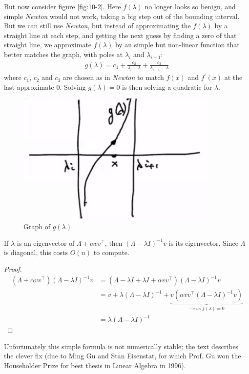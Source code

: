 \documentclass[11pt]{article}
\numberwithin{equation}{section}
\begin{document}
But now consider figure \ref{fig:10-2}. Here $f(\lambda)$ no longer looks so benign, and simple \textit{Newton} would not work,
taking a big step out of the bounding interval. But we can still use \textit{Newton}, but instead of approximating the $f(\lambda)$ by a straight line at each step,
and getting the next guess by finding a zero of that straight line, we approximate $f(\lambda)$ by an simple but non-linear function that better matches the graph, 
with poles at $\lambda_i$ and $\lambda_{i+1}$:
\begin{align*}
    g(\lambda)=c_{1}+ \frac{c_{2}}{\lambda_{i}-\lambda} + \frac{c_{3}}{\lambda_{i+1}-\lambda}
\end{align*}
where $c_1$, $c_2$ and $c_3$ are chosen as in \textit{Newton} to match $f(x)$ and $f^\prime (x)$ at the last approximate 0. 
Solving $g(\lambda)=0$ is then solving a quadratic for $\lambda$.

\begin{figure}[h]
    \centering
    \includegraphics[width = 10cm]{images/lec10-3.png}
    \caption{Graph of $g(\lambda)$}
    \label{fig:10-3}
\end{figure}

\begin{lemma}
    If $\lambda$ is an eigenvector of $\Lambda + \alpha vv^\top$, then $(\Lambda - \lambda I)^{-1}v$ is its eigenvector. Since $\Lambda$ is diagonal, this costs $O(n)$ to compute.
    \begin{proof}
        \begin{align*}
            (\Lambda + \alpha vv^\top)(\Lambda - \lambda I)^{-1}v &= (\Lambda - \lambda I + \lambda I + \alpha vv^\top)(\Lambda - \lambda I)^{-1}v \\
            &= v + \lambda (\Lambda - \lambda I)^{-1} + \underbrace{v\left( \alpha vv^\top (\Lambda - \lambda I)^{-1}v \right)}_{-v \text{ as }f(\lambda)=0} \\
            &= \lambda (\Lambda - \lambda I)^{-1}
        \end{align*}
    \end{proof}
\end{lemma}
Unfortunately this simple formula is not numerically stable; the text describes the clever fix (due to Ming Gu and Stan Eisenstat, 
for which Prof. Gu won the Householder Prize for best thesis in Linear Algebra in 1996).
\end{document}

